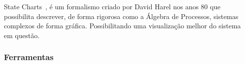 State Charts~\cite{Harel:1987:SVF:34884.34886},
é um formalismo criado por David Harel nos anos 80
que possibilita descrever, de forma rigorosa como a
Álgebra de Processos, sistemas complexos de forma gráfica.
Possibilitando uma visualização melhor do sistema em questão.

\subsubsection{Ferramentas}
\paragraph{}
\lipsum[1]
